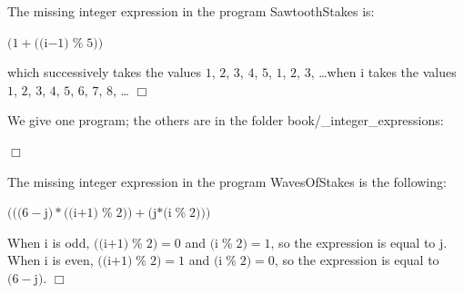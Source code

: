 \begin{corrige} {The missing integer expression in the program {\idt Saw\-tooth\-Stakes} is:
\begin{center}
$(1 + ((${\idt i}$ - 1)\;${\idt \%}$\;5))$
\end{center}
which successively takes the values $1$, $2$, $3$, $4$, $5$, $1$, $2$, $3$, \dots when {\idt i} takes the
values $1$, $2$, $3$, $4$, $5$, $6$, $7$, $8$, \ldots
\noindent $\Box$}\end{corrige}
\begin{corrige} {We give one program; the others are in the folder
{\idt book/\_integer\_expressions}:

\noindent $\Box$}\end{corrige}
\begin{corrige} {The missing integer expression in the program {\idt WavesOfStakes} is the following:
\begin{center}
$(((6-${\idt j}$)\ast ((${\idt i}$+1)\;${\idt \%}$\;2))+(${\idt j}$\ast(${\idt i}$\;${\idt \%}$\;2)))$
\end{center}
When {\idt i} is odd, $((${\idt i}$+1)\;${\idt \%}$\;2) = 0$ and $(${\idt i}$\;${\idt \%}$\;2) = 1$,
so the expression is equal to {\idt j}. When {\idt i} is even, $((${\idt i}$+1)\;${\idt \%}$\;2) = 1$ and
$(${\idt i}$\;${\idt \%}$\;2) = 0$, so the expression is equal to $(6-${\idt j}$)$.
$\Box$}\end{corrige}
